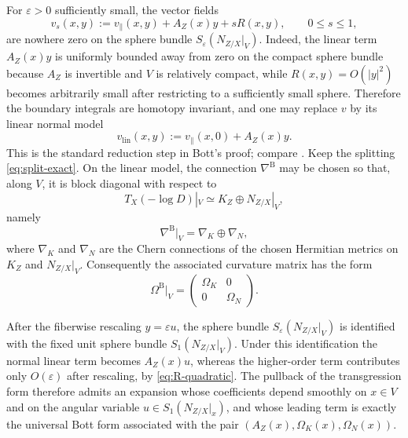 \documentclass[12pt,a4paper,dvipsnames,x11names]{amsart}
\numberwithin{equation}{section}
\theoremstyle{plain}
\theoremstyle{definition}
\theoremstyle{remark}
\begin{document}
For $\varepsilon>0$ sufficiently small, the vector fields
\begin{equation}\label{eq:homotopy-v}
v_s(x,y):=v_{\parallel}(x,y)+A_Z(x)y+sR(x,y),
\qquad 0\le s\le 1,
\end{equation}
are nowhere zero on the sphere bundle $S_\varepsilon(N_{Z/X}|_V)$.
Indeed, the linear term $A_Z(x)y$ is uniformly bounded away from zero on the compact sphere bundle because $A_Z$ is invertible and $V$ is relatively compact, while $R(x,y)=O(|y|^2)$ becomes arbitrarily small after restricting to a sufficiently small sphere. Therefore the boundary integrals are homotopy invariant, and one may replace $v$ by its linear normal model
\begin{equation}\label{eq:linear-model}
v_{\mathrm{lin}}(x,y):=v_{\parallel}(x,0)+A_Z(x)y.
\end{equation}
This is the standard reduction step in Bott's proof; compare \cite{Bott67b,BottTu,SuwaBook}.
Keep the splitting \eqref{eq:split-exact}. On the linear model, the connection $\nabla^{\mathrm B}$ may be chosen so that, along $V$, it is block diagonal with respect to
$$
T_X(-\log D)|_V\simeq K_Z\oplus N_{Z/X}|_V,
$$
namely
\begin{equation}\label{eq:block-diagonal-connection}
\nabla^{\mathrm B}|_V=\nabla_K\oplus \nabla_N,
\end{equation}
where $\nabla_K$ and $\nabla_N$ are the Chern connections of the chosen Hermitian metrics on $K_Z$ and $N_{Z/X}|_V$.
Consequently the associated curvature matrix has the form
\begin{equation}\label{eq:block-curvature}
\Omega^{\mathrm B}|_V=
\begin{pmatrix}
\Omega_K & 0\\
0 & \Omega_N
\end{pmatrix}.
\end{equation}

After the fiberwise rescaling $y=\varepsilon u$, the sphere bundle $S_\varepsilon(N_{Z/X}|_V)$ is identified with the fixed unit sphere bundle $S_1(N_{Z/X}|_V)$. Under this identification the normal linear term becomes $A_Z(x)u$, whereas the higher-order term contributes only $O(\varepsilon)$ after rescaling, by \eqref{eq:R-quadratic}. The pullback of the transgression form therefore admits an expansion whose coefficients depend smoothly on $x\in V$ and on the angular variable $u\in S_1(N_{Z/X}|_x)$, and whose leading term is exactly the universal Bott form associated with the pair $(A_Z(x),\Omega_K(x),\Omega_N(x))$.
\end{document}
